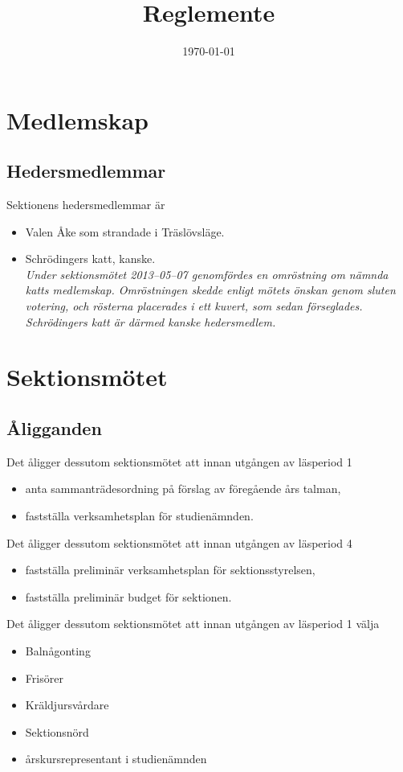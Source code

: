 \documentclass{styrdokument}
\title{Reglemente}
\date{\today}
\begin{document}
\section{Medlemskap}
\subsection{Hedersmedlemmar}

\? Sektionens hedersmedlemmar är
\begin{itemize}
    \item Valen Åke som strandade i Träslövsläge.
    \item Schrödingers katt, kanske.\\
    {\footnotesize\itshape Under sektionsmötet 2013–05–07 genomfördes en omröstning om nämnda katts medlemskap. Omröstningen skedde enligt mötets önskan genom sluten votering, och rösterna placerades i ett kuvert, som sedan förseglades.
    Schrödingers katt är därmed kanske hedersmedlem.}
\end{itemize}

\section{Sektionsmötet}
\subsection{Åligganden}

\? Det åligger dessutom sektionsmötet att innan utgången av läsperiod 1
\begin{itemize}
    \item anta sammanträdesordning på förslag av föregående års talman,
    \item fastställa verksamhetsplan för studienämnden.
\end{itemize}

\? Det åligger dessutom sektionsmötet att innan utgången av läsperiod 4
\begin{itemize}
    \item fastställa preliminär verksamhetsplan för sektionsstyrelsen,
    \item fastställa preliminär budget för sektionen.
\end{itemize}

\? Det åligger dessutom sektionsmötet att innan utgången av läsperiod 1 välja
\begin{itemize}
    \item Balnågonting
    \item Frisörer
    \item Kräldjursvårdare
    \item Sektionsnörd
    \item årskursrepresentant i studienämnden
\end{itemize}
\end{document}
